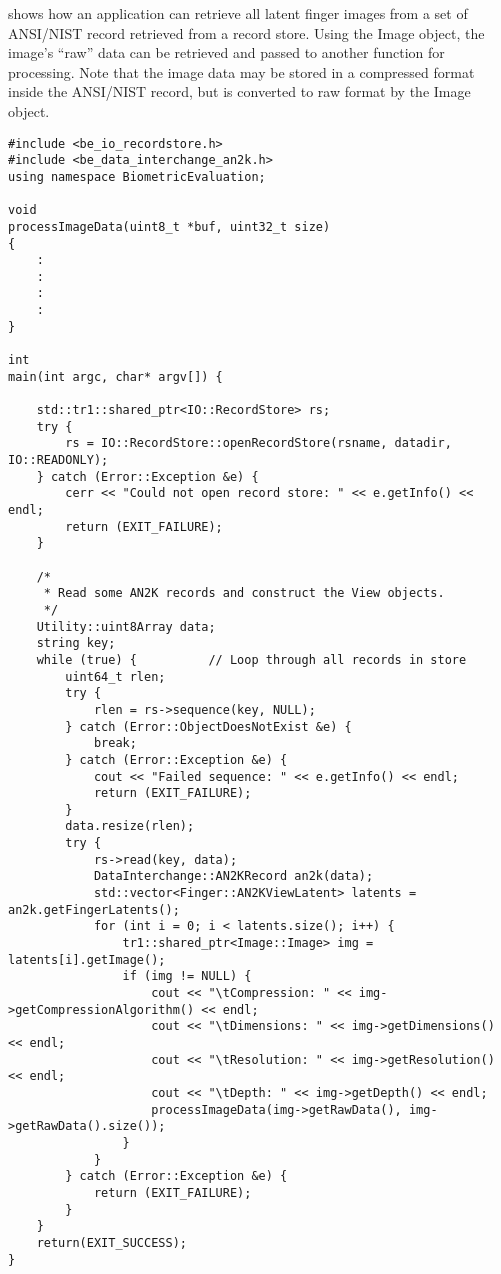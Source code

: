  shows how an application can retrieve all latent
finger images from a set of ANSI/NIST record retrieved from a record store.
Using the Image object, the image's ``raw'' data can be retrieved and passed
to another function for processing. Note that the image data may be stored
in a compressed format inside the ANSI/NIST record, but is converted to raw
format by the Image object.

\lstset{language=c++}
\begin{lstlisting}[caption={Retrieving ANSI/NIST Records}, label=an2klatentuse]
#include <be_io_recordstore.h>
#include <be_data_interchange_an2k.h>
using namespace BiometricEvaluation;

void
processImageData(uint8_t *buf, uint32_t size)
{
    :
    :
    :
    :
}

int
main(int argc, char* argv[]) {

    std::tr1::shared_ptr<IO::RecordStore> rs;
    try {
        rs = IO::RecordStore::openRecordStore(rsname, datadir, IO::READONLY);
    } catch (Error::Exception &e) {
        cerr << "Could not open record store: " << e.getInfo() << endl;
        return (EXIT_FAILURE);
    }

    /*
     * Read some AN2K records and construct the View objects.
     */
    Utility::uint8Array data;
    string key;
    while (true) {          // Loop through all records in store
        uint64_t rlen;
        try {
            rlen = rs->sequence(key, NULL);
        } catch (Error::ObjectDoesNotExist &e) {
            break;
        } catch (Error::Exception &e) {
            cout << "Failed sequence: " << e.getInfo() << endl;
            return (EXIT_FAILURE);
        }
        data.resize(rlen);
        try {
            rs->read(key, data);
            DataInterchange::AN2KRecord an2k(data);
            std::vector<Finger::AN2KViewLatent> latents = an2k.getFingerLatents();
            for (int i = 0; i < latents.size(); i++) {
                tr1::shared_ptr<Image::Image> img = latents[i].getImage();
                if (img != NULL) {
                    cout << "\tCompression: " << img->getCompressionAlgorithm() << endl;
                    cout << "\tDimensions: " << img->getDimensions() << endl;
                    cout << "\tResolution: " << img->getResolution() << endl;
                    cout << "\tDepth: " << img->getDepth() << endl;
                    processImageData(img->getRawData(), img->getRawData().size());
                }
            }
        } catch (Error::Exception &e) {
            return (EXIT_FAILURE);
        }
    }
    return(EXIT_SUCCESS);
}
\end{lstlisting}

